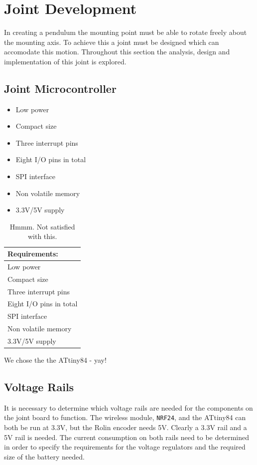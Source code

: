 \section{Joint Development}
\label{sec:joint_development}
In creating a pendulum the mounting point must be able to rotate freely about the mounting axis.
To achieve this a joint must be designed which can accomodate this motion.
Throughout this section the analysis, design and implementation of this joint is explored.





\subsection{Joint Microcontroller}
\label{sub:joint_microcontroller}


\begin{itemize}
	\item Low power
	\item Compact size
	\item Three interrupt pins
	\item Eight I/O pins in total 
	\item SPI interface
	\item Non volatile memory
	\item 3.3V/5V supply
\end{itemize}


\begin{table}
	\centering
	\begin{tabular}{l}
		 \textbf{Requirements:} \\ \hline
		 Low power \\ \hline
		 Compact size \\ \hline
		 Three interrupt pins \\ \hline
		 Eight I/O pins in total\\ \hline
		 SPI interface \\ \hline
		 Non volatile memory \\ \hline
		 3.3V/5V supply \\ \hline
	\end{tabular}
	\caption{Hmmm. Not satisfied with this.}
	\label{tab:joint_mic_rec}
\end{table}

We chose the the ATtiny84 - yay!


\subsection{Voltage Rails}
\label{sub:voltage_rail}
It is necessary to determine which voltage rails are needed for the components on the joint board to function.
The wireless module, \texttt{NRF24}, and the ATtiny84 can both be run at 3.3V, but the Rolin encoder needs 5V.
Clearly a 3.3V rail and a 5V rail is needed. 
The current consumption on both rails need to be determined in order to specify the requirements for the voltage regulators and the required size of the battery needed.


